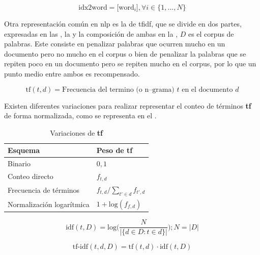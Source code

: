 \begin{equation} \label{eq:bow-repr2}
  \text{idx2word} = \Big[\text{word}_i\Big], \forall i \in \{1, \ldots, N\}
\end{equation}

Otra representación común en \gls{nlp} es la de \gls{tfidf}, que se divide en dos partes, expresadas en las , la  y la composición de ambas en la , $D$ es el corpus de palabras. Este consiste en penalizar palabras que ocurren mucho en un documento pero no mucho en el corpus o bien de penalizar la palabras que se repiten poco en un documento pero se repiten mucho en el corpus, por lo que un punto medio entre ambos es recompensado.

\begin{equation} \label{eq:tf-repr}
  \text{tf}(t,d) = \text{Frecuencia del termino (o n--grama) } t \text{ en el documento } d
\end{equation}

Existen diferentes variaciones para realizar representar el conteo de términos \textbf{tf} de forma normalizada, como se representa en el .

\begin{table}[h!]
\centering
\begin{tabular}{|l|l|} \hline
  \textbf{Esquema}          & \textbf{Peso de tf} \\ \hline
  Binario                   & $0, 1$ \\ \hline
  Conteo directo            & $f_{t, d}$ \\ \hline
  Frecuencia de términos    & $f_{t, d} / \sum_{t' \in d}f_{t', d}$ \\ \hline
  Normalización logarítmica & $1 + \text{log}(f_{f, d})$ \\ \hline
\end{tabular}
\caption{Variaciones de \textbf{tf}}
\label{table:tf}
\end{table}

\begin{equation} \label{eq:idf-repr}
  \text{idf}(t, D) = \text{log}\Bigg( \frac{N}{|\{d \in D : t \in d\}|} \Bigg) ; N = |D|
\end{equation}

\begin{equation} \label{eq:tfidf-repr}
  \text{tf-idf}(t, d, D) = \text{tf}(t, d) \cdot \text{idf}(t, D)
\end{equation}

